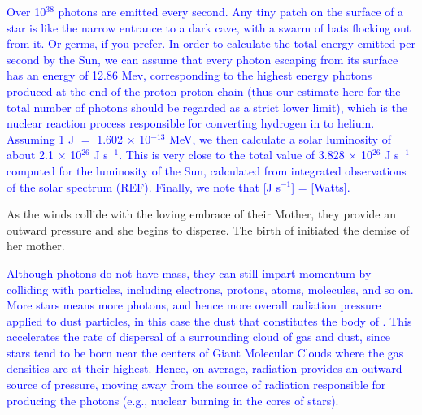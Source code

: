 \documentclass[main.tex]{subfiles}
\begin{document}
\begin{tcolorbox}[sharp corners, colback=blue!30, colframe=blue!80!blue, title=Stellar luminosity]
\par \textcolor{blue} {Over 10$^{38}$ photons are emitted every second.  Any tiny patch on the surface of a star is like the narrow entrance to a dark cave, with a swarm of bats flocking out from it.  Or germs, if you prefer.  In order to calculate the total energy emitted per second by the Sun, we can assume that every photon escaping from its surface has an energy of 12.86 Mev, corresponding to the highest energy photons produced at the end of the proton-proton-chain (thus our estimate here for the total number of photons should be regarded as a strict lower limit), which is the nuclear reaction process responsible for converting hydrogen in to helium.  Assuming 1 J $=$ 1.602 $\times$ 10$^{-13}$ MeV, we then calculate a solar luminosity of about 2.1 ${\times}$ 10$^{26}$ J s$^{-1}$.  This is very close to the total value of 3.828 $\times$ 10$^{26}$ J s$^{-1}$ computed for the luminosity of the Sun, calculated from integrated observations of the solar spectrum (REF). Finally, we note that [J s$^{-1}$] = [Watts].}  
\end{tcolorbox}

\par \nar As the winds collide with the loving embrace of their Mother, they provide an outward pressure and she begins to disperse.  The birth of \rmmaia initiated the demise of her mother.  

\begin{tcolorbox}[sharp corners, colback=blue!30, colframe=blue!80!blue, title=Radiation Pressure]
\par \textcolor{blue} {Although photons do not have mass, they can still impart momentum by colliding with particles, including electrons, protons, atoms, molecules, and so on.  More stars means more photons, and hence more overall radiation pressure applied to dust particles, in this case the dust that constitutes the body of \rmpleione.  This accelerates the rate of dispersal of a surrounding cloud of gas and dust, since stars tend to be born near the centers of Giant Molecular Clouds where the gas densities are at their highest.  Hence, on average, radiation provides an outward source of pressure, moving away from the source of radiation responsible for producing the photons (e.g., nuclear burning in the cores of stars).}  %
\end{tcolorbox}
\end{document}
